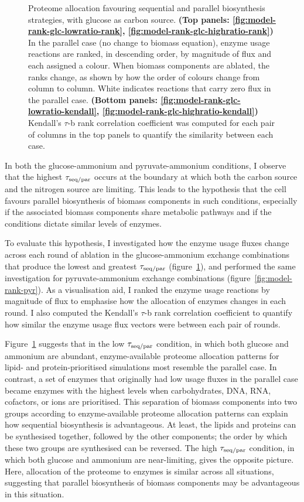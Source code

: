 \begin{figure}
  \caption{
    Proteome allocation favouring sequential and parallel biosynthesis strategies, with glucose as carbon source.
    \textbf{(Top panels: \ref{fig:model-rank-glc-lowratio-rank}, \ref{fig:model-rank-glc-highratio-rank})} In the parallel case (no change to biomass equation), enzyme usage reactions are ranked, in descending order, by magnitude of flux and each assigned a colour.
    When biomass components are ablated, the ranks change, as shown by how the order of colours change from column to column.
    White indicates reactions that carry zero flux in the parallel case.
    \textbf{(Bottom panels: \ref{fig:model-rank-glc-lowratio-kendall}, \ref{fig:model-rank-glc-highratio-kendall})} Kendall's $\tau$-b rank correlation coefficient was computed for each pair of columns in the top panels to quantify the similarity between each case.
  }
  \label{fig:model-rank-glc}
\end{figure}

In both the glucose-ammonium and pyruvate-ammonium conditions, I observe that the highest $\tau_{\mathrm{seq}/\mathrm{par}}$ occurs at the boundary at which both the carbon source and the nitrogen source are limiting.
This leads to the hypothesis that the cell favours parallel biosynthesis of biomass components in such conditions, especially if the associated biomass components share metabolic pathways and if the conditions dictate similar levels of enzymes.

To evaluate this hypothesis, I investigated how the enzyme usage fluxes change across each round of ablation in the glucose-ammonium exchange combinations that produce the lowest and greatest $\tau_{\mathrm{seq}/\mathrm{par}}$ (figure~\ref{fig:model-rank-glc}), and performed the same investigation for pyruvate-ammonium exchange combinations (figure~\ref{fig:model-rank-pyr}).
As a visualisation aid, I ranked the enzyme usage reactions by magnitude of flux to emphasise how the allocation of enzymes changes in each round.
I also computed the Kendall's $\tau$-b rank correlation coefficient \parencite{kendallTREATMENTTIESRANKING1945} to quantify how similar the enzyme usage flux vectors were between each pair of rounds.

Figure~\ref{fig:model-rank-glc} suggests that in the low $\tau_{\mathrm{seq}/\mathrm{par}}$ condition, in which both glucose and ammonium are abundant, enzyme-available proteome allocation patterns for lipid- and protein-prioritised simulations most resemble the parallel case.
In contrast, a set of enzymes that originally had low usage fluxes in the parallel case became enzymes with the highest levels when carbohydrates, DNA, RNA, cofactors, or ions are prioritised.
This separation of biomass components into two groups according to enzyme-available proteome allocation patterns can explain how sequential biosynthesis is advantageous.
At least, the lipids and proteins can be synthesised together, followed by the other components; the order by which these two groups are synthesised can be reversed.
The high $\tau_{\mathrm{seq}/\mathrm{par}}$ condition, in which both glucose and ammonium are near-limiting, gives the opposite picture.
Here, allocation of the proteome to enzymes is similar across all situations, suggesting that parallel biosynthesis of biomass components may be advantageous in this situation.

